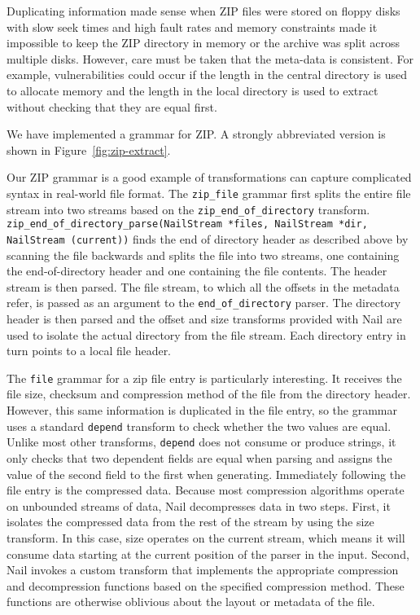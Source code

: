 Duplicating information made sense when ZIP files were
stored on floppy disks with slow seek times and high fault rates and memory constraints made it
impossible to keep the ZIP directory in memory or the archive was split across multiple disks.
However, care must be taken that the meta-data is consistent. For example, vulnerabilities could occur
if the length in the central directory is used to allocate memory and the length in the local
directory is used to extract without checking that they are equal first. 

We have implemented a grammar for ZIP. A strongly abbreviated version is shown in
Figure~\ref{fig:zip-extract}.

Our ZIP grammar is a good example of transformations can capture complicated syntax in real-world
file format. The \texttt{zip\_file} grammar first splits the entire file stream into two streams
based on the \texttt{zip\_end\_of\_directory} transform.
\texttt{zip\_end\_of\_directory_parse(NailStream *files, NailStream *dir, NailStream (current))}
finds the end of directory header as described above by scanning the file backwards and splits the
file into two streams, one containing the end-of-directory header and one containing the file
contents. The header stream is then parsed. The file stream, to which all the offsets in the
metadata refer, is passed as an argument to the \texttt{end\_of\_directory} parser.
The directory header is then parsed and the offset and size transforms provided with Nail are used
to isolate the actual directory from the file stream. Each directory entry in turn points to a local
file header. 

The \texttt{file} grammar for a zip file entry is particularly interesting. It receives the file
size, checksum and compression method of the file from the directory header. However, this same
information is duplicated in the file entry, so the grammar uses a standard \texttt{depend}
transform to check whether the two values are equal. Unlike most other transforms, \texttt{depend}
does not consume or produce strings, it only checks that two dependent fields are equal when parsing
and assigns the value of the second field to the first when generating. Immediately following the
file entry is the compressed data. Because most compression algorithms operate on unbounded streams
of data, Nail decompresses data in two steps.
First, it isolates the compressed data from the rest of the stream by using the size transform. In
this case, size operates on the current stream, which means it will consume data starting at the
current position of the parser in the input.
Second, Nail invokes a custom transform that implements the appropriate compression and decompression
functions based on the specified compression method. These functions are otherwise oblivious about
the layout or metadata of the file.

